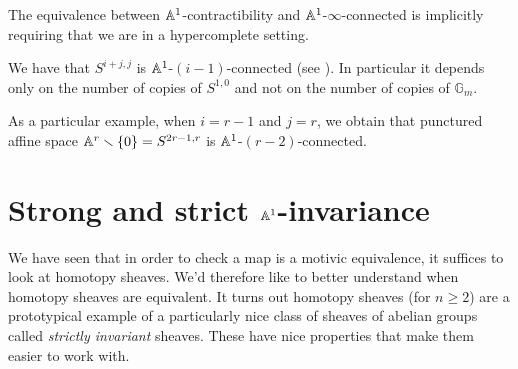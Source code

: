 \documentclass[11pt,openany]{book}
\begin{document}
\begin{warning}
    The equivalence between $\mathbb{A}^1$-contractibility and $\mathbb{A}^1$-$\infty$-connected is implicitly requiring that we are in a hypercomplete setting.
\end{warning}


\begin{example}\label{exa:connectivity-motivic-spheres} 
We have that $S^{i+j,j}$ is $\mathbb{A}^1$-$(i-1)$-connected (see \cite[2.4.5]{AO-contractible}). In particular it depends only on the number of copies of $S^{1,0}$ and not on the number of copies of $\mathbb{G}_m$.
\end{example}

\begin{example}\label{exa:connectivity-punctured-affine-space}
As a particular example, when $i=r-1$ and $j=r$, we obtain that punctured affine space $\mathbb{A}^r\smallsetminus\{0\} = S^{2r-1,r}$ is $\mathbb{A}^1$-$(r-2)$-connected. 
\end{example}









\section{Strong and strict \texorpdfstring{$\mathbb{A}^1$}{A\^{}1}-invariance}

\begin{goal} 
We have seen that in order to check a map is a motivic equivalence, it suffices to look at homotopy sheaves. We'd therefore like to better understand when homotopy sheaves are equivalent. It turns out homotopy sheaves (for $n\ge 2$) are a prototypical example of a particularly nice class of sheaves of abelian groups called \textit{strictly invariant} sheaves. These have nice properties that make them easier to work with.
\end{goal}
\end{document}
